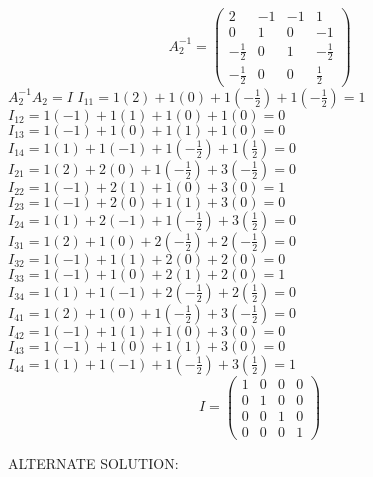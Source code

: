 \documentclass[12pt]{article}
\begin{document}
\begin{itemize}
\[
A_2^{-1} = 
\begin{pmatrix}
2 & -1 & -1 & 1\\
0 & 1 & 0 & -1 \\
-\frac{1}{2} & 0 & 1 & -\frac{1}{2} \\
-\frac{1}{2} & 0 & 0 & \frac{1}{2}
\end{pmatrix}
\]
$A_2^{-1}A_2=I$
\newline $I_{11}=1(2)+1(0)+1(-\frac{1}{2})+1(-\frac{1}{2})=1$
\newline $I_{12}=1(-1)+1(1)+1(0)+1(0)=0$
\newline $I_{13}=1(-1)+1(0)+1(1)+1(0)=0$
\newline $I_{14}=1(1)+1(-1)+1(-\frac{1}{2})+1(\frac{1}{2})=0$
\newline $I_{21}=1(2)+2(0)+1(-\frac{1}{2})+3(-\frac{1}{2})=0$
\newline $I_{22}=1(-1)+2(1)+1(0)+3(0)=1$
\newline $I_{23}=1(-1)+2(0)+1(1)+3(0)=0$
\newline $I_{24}=1(1)+2(-1)+1(-\frac{1}{2})+3(\frac{1}{2})=0$
\newline $I_{31}=1(2)+1(0)+2(-\frac{1}{2})+2(-\frac{1}{2})=0$
\newline $I_{32}=1(-1)+1(1)+2(0)+2(0)=0$
\newline $I_{33}=1(-1)+1(0)+2(1)+2(0)=1$
\newline $I_{34}=1(1)+1(-1)+2(-\frac{1}{2})+2(\frac{1}{2})=0$
\newline $I_{41}=1(2)+1(0)+1(-\frac{1}{2})+3(-\frac{1}{2})=0$
\newline $I_{42}=1(-1)+1(1)+1(0)+3(0)=0$
\newline $I_{43}=1(-1)+1(0)+1(1)+3(0)=0$
\newline $I_{44}=1(1)+1(-1)+1(-\frac{1}{2})+3(\frac{1}{2})=1$
\[
I = 
\begin{pmatrix}
1 & 0 & 0 & 0\\
0 & 1 & 0 & 0 \\
0 & 0 & 1 & 0 \\
0 & 0 & 0 & 1
\end{pmatrix}
\]


ALTERNATE SOLUTION:


\end{itemize}
\end{document}
